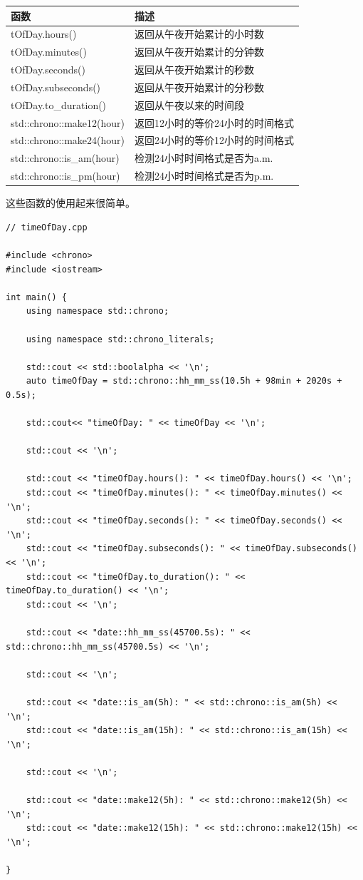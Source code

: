 \begin{table}[H]
\centering
\begin{tabular}{ll}
\textbf{函数}         & \textbf{描述}                        \\ \hline
tOfDay.hours()            & 返回从午夜开始累计的小时数   \\
tOfDay.minutes()          & 返回从午夜开始累计的分钟数 \\
tOfDay.seconds()          & 返回从午夜开始累计的秒数 \\
tOfDay.subseconds()       & 返回从午夜开始累计的分秒数  \\
tOfDay.to\_duration()     & 返回从午夜以来的时间段    \\
std::chrono::make12(hour) & 返回12小时的等价24小时的时间格式 \\
std::chrono::make24(hour) & 返回24小时的等价12小时的时间格式 \\
std::chrono::is\_am(hour) & 检测24小时时间格式是否为a.m.  \\
std::chrono::is\_pm(hour) & 检测24小时时间格式是否为p.m.
\end{tabular}
\end{table}

这些函数的使用起来很简单。

\begin{lstlisting}[style=styleCXX]
// timeOfDay.cpp

#include <chrono>
#include <iostream>

int main() {
	using namespace std::chrono;    
	
	using namespace std::chrono_literals;
	
	std::cout << std::boolalpha << '\n';
	auto timeOfDay = std::chrono::hh_mm_ss(10.5h + 98min + 2020s + 0.5s);
	
	std::cout<< "timeOfDay: " << timeOfDay << '\n';
	
	std::cout << '\n';
	
	std::cout << "timeOfDay.hours(): " << timeOfDay.hours() << '\n';
	std::cout << "timeOfDay.minutes(): " << timeOfDay.minutes() << '\n';
	std::cout << "timeOfDay.seconds(): " << timeOfDay.seconds() << '\n';
	std::cout << "timeOfDay.subseconds(): " << timeOfDay.subseconds() << '\n';
	std::cout << "timeOfDay.to_duration(): " << timeOfDay.to_duration() << '\n';
	std::cout << '\n';
	
	std::cout << "date::hh_mm_ss(45700.5s): " << std::chrono::hh_mm_ss(45700.5s) << '\n';
	
	std::cout << '\n';
	
	std::cout << "date::is_am(5h): " << std::chrono::is_am(5h) << '\n';
	std::cout << "date::is_am(15h): " << std::chrono::is_am(15h) << '\n';
	
	std::cout << '\n';
	
	std::cout << "date::make12(5h): " << std::chrono::make12(5h) << '\n';
	std::cout << "date::make12(15h): " << std::chrono::make12(15h) << '\n';
	
}
\end{lstlisting}

